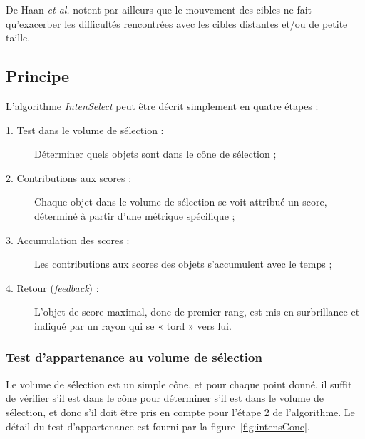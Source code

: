 	De Haan \emph{et al.} notent par ailleurs que le mouvement des cibles ne fait qu'exacerber les difficultés rencontrées avec les cibles distantes et/ou de petite taille.
	
	\subsection{Principe}
	L'algorithme \emph{IntenSelect} peut être décrit simplement en quatre étapes :
	
	\begin{description}
		\item[1. Test dans le volume de sélection :] Déterminer quels objets sont dans le cône de sélection ;
		\item[2. Contributions aux scores :] Chaque objet dans le volume de sélection se voit attribué un score, déterminé à partir d'une métrique spécifique ;
		\item[3. Accumulation des scores :] Les contributions aux scores des objets s'accumulent avec le temps ;
		\item[4. Retour (\emph{feedback}) :] L'objet de score maximal, donc de premier rang, est mis en surbrillance et indiqué par un rayon qui se « tord » vers lui.
	\end{description}
	
	\subsubsection{Test d'appartenance au volume de sélection}
	Le volume de sélection est un simple cône, et pour chaque point donné, il suffit de vérifier s'il est dans le cône pour déterminer s'il est dans le volume de sélection, et donc s'il doit être pris en compte pour l'étape 2 de l'algorithme. Le détail du test d'appartenance est fourni par la figure~\ref{fig:intensCone}.
	
